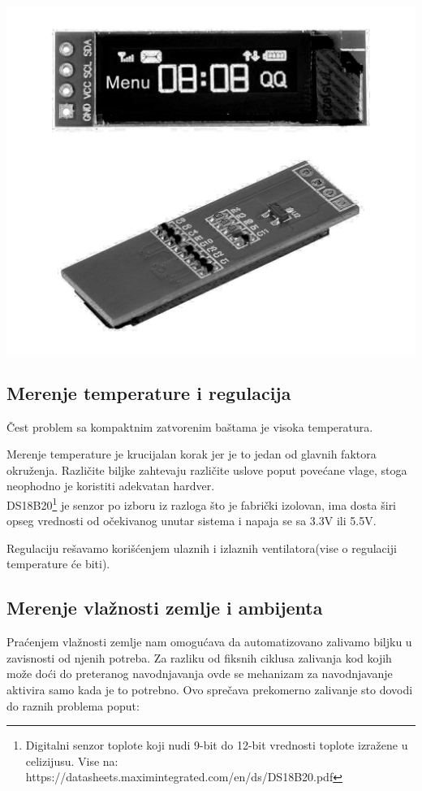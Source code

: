 \documentclass[a4paper,11pt]{book}
\begin{document}
\includegraphics[width=\textwidth]{oled.png}

\subsection{Merenje temperature i regulacija}

Čest problem sa kompaktnim zatvorenim baštama je visoka temperatura.

Merenje temperature je krucijalan korak jer je to jedan od glavnih faktora okruženja. Različite biljke zahtevaju različite uslove poput povećane vlage, stoga neophodno je koristiti adekvatan hardver.\\ 

\noindent DS18B20\footnote{Digitalni senzor toplote koji nudi 9-bit do 12-bit vrednosti toplote izražene u celizijusu. Vise na: https://datasheets.maximintegrated.com/en/ds/DS18B20.pdf} je senzor po izboru iz razloga što je fabrički izolovan, ima dosta širi opseg vrednosti od očekivanog unutar sistema i napaja se sa 3.3V ili 5.5V.

Regulaciju rešavamo korišćenjem ulaznih i izlaznih ventilatora(vise o regulaciji temperature će biti).

\subsection{Merenje vlažnosti zemlje i ambijenta}
Praćenjem vlažnosti zemlje nam omogućava da automatizovano zalivamo biljku u zavisnosti od njenih potreba. Za razliku od fiksnih ciklusa zalivanja kod kojih može doći do preteranog navodnjavanja ovde se mehanizam za navodnjavanje aktivira samo kada je to potrebno. Ovo sprečava prekomerno zalivanje sto dovodi do raznih problema poput:
\end{document}
